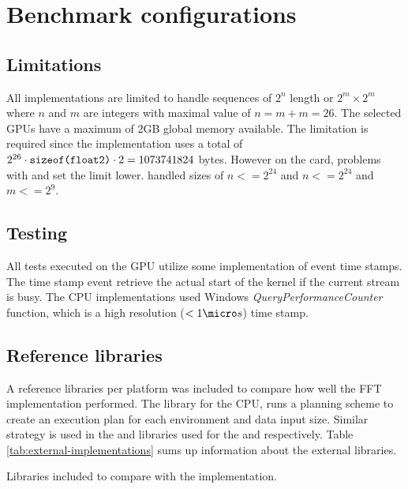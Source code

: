 \section{Benchmark configurations}

\subsection{Limitations}

All implementations are limited to handle sequences of $2^n$ length or $2^m \times 2^m$ where $n$ and $m$ are integers with maximal value of $n = m + m = 26$. The selected \gls{GPU}s have a maximum of 2GB global memory available. The limitation is required since the implementation uses a total of $2^{26} \cdot \texttt{sizeof(float2)} \cdot 2 = 1073741824$ bytes. However on the {\AMDCARD} card, problems with {\DX} and {\GL} set the limit lower. {\DX} handled sizes of $n <= 2^{24}$ and {\GL} $n <= 2^{24}$ and $m <= 2^{9}$.

\subsection{Testing}

All tests executed on the \gls{GPU} utilize some implementation of event time stamps. The time stamp event retrieve the actual start of the kernel if the current stream is busy. The \gls{CPU} implementations used Windows \emph{QueryPerformanceCounter} function, which is a high resolution ($<1{\micro}s$) time stamp.

\subsection{Reference libraries}

A reference libraries per platform was included to compare how well the FFT implementation performed. The \emph{\FFTW} library for the \gls{CPU}, runs a planning scheme to create an execution plan for each environment and data input size. Similar strategy is used in the {\CUFFT} and {\CLFFT} libraries used for the {\NVCARD} and {\AMDCARD} respectively. Table \ref{tab:external-implementations} sums up information about the external libraries.

\begin{table}
	\centering
	
	\caption{Libraries included to compare with the implementation.}
	\label{tab:external-implementations}
\end{table}
